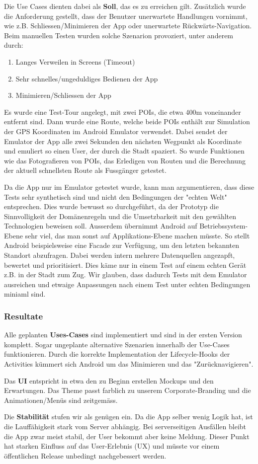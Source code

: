 Die Use Cases dienten dabei als \textbf{Soll}, das es zu erreichen gilt. Zusätzlich wurde die Anforderung
gestellt, dass der Benutzer unerwartete Handlungen vornimmt, wie z.B. Schliessen/Minimieren der App oder
unerwartete Rückwärts-Navigation. Beim manuellen Testen wurden solche Szenarion provoziert, unter anderem
durch:

\begin{enumerate}
  \item Langes Verweilen in Screens (Timeout)
  \item Sehr schnelles/ungeduldiges Bedienen der App
  \item Minimieren/Schliessen der App
\end{enumerate}

Es wurde eine Test-Tour angelegt, mit zwei POIs, die etwa 400m voneinander entfernt sind. Dann wurde
eine Route, welche beide POIs enthält zur Simulation der GPS Koordinaten im Android Emulator verwendet.
Dabei sendet der Emulator der App alle zwei Sekunden den nächsten Wegpunkt als Koordinate und emuliert
so einen User, der durch die Stadt spaziert. So wurde Funktionen wie das Fotografieren von POIs, das
Erledigen von Routen und die Berechnung der aktuell schnellsten Route als Fussgänger getestet.

Da die App nur im Emulator getestet wurde, kann man argumentieren, dass diese Tests sehr synthetisch
sind und nicht den Bedingungen der "echten Welt" entsprechen. Dies wurde bewusst so durchgeführt, da
der Prototyp die Sinnvolligkeit der Domänenregeln und die Umsetzbarkeit mit den gewählten Technologien
beweisen soll.
Ausserdem übernimmt Android auf Betriebssystem-Ebene sehr viel, das man sonst auf Applikations-Ebene
machen müsste. So stellt Android beispielsweise eine Facade zur Verfügung, um den letzten bekannten
Standort abzufragen. Dabei werden intern mehrere Datenquellen angezapft, bewertet und prioritisiert.
Dies käme nur in einem Test auf einem echten Gerät z.B. in der Stadt zum Zug. Wir glauben, dass dadurch
Tests mit dem Emulator ausreichen und etwaige Anpassungen nach einem Test unter echten Bedingungen
miniaml sind.

\subsubsection{Resultate}\label{test_resulate}
Alle geplanten \textbf{Uses-Cases} sind implementiert und sind in der ersten Version komplett. Sogar
ungeplante alternative Szenarien innerhalb der Use-Cases funktionieren. Durch die korrekte Implementation
der Lifecycle-Hooks der Activities kümmert sich Android um das Minimieren und das "Zurücknavigieren".

Das \textbf{UI} entspricht in etwa den zu Beginn erstellen Mockups und den Erwartungen. Das Theme passt
farblich zu unserem Corporate-Branding und die Animationen/Menüs sind zeitgemäss.

Die \textbf{Stabilität} stufen wir als genügen ein. Da die App selber wenig Logik hat, ist die Lauffähigkeit
stark vom Server abhängig. Bei serverseitigen Ausfällen bleibt die App zwar meist stabil, der User
bekommt aber keine Meldung. Dieser Punkt hat starken Einfluss auf das User-Erlebnis (UX) und müsste
vor einem öffentlichen Release unbedingt nachgebessert werden.
